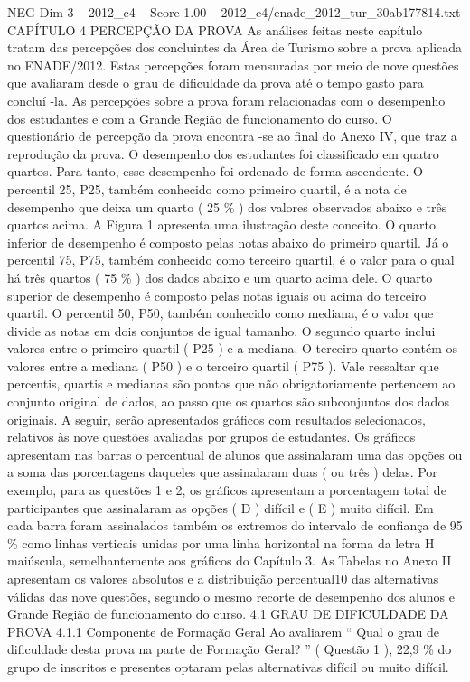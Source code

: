 \begin{textsample}{NEG Dim 3 – 2012\_c4 – Score 1.00 – 2012\_c4/enade\_2012\_tur\_30ab177814.txt}  \label{ex:f3_neg_132}
CAPÍTULO 4 PERCEPÇÃO DA PROVA As análises feitas neste capítulo tratam das percepções dos concluintes da Área de Turismo sobre a prova aplicada no ENADE/2012.
Estas percepções foram mensuradas por meio de nove questões que avaliaram desde o grau de dificuldade da prova até o tempo gasto para concluí -la.
As percepções sobre a prova foram relacionadas com o desempenho dos estudantes e com a Grande Região de funcionamento do curso.
O questionário de percepção da prova encontra -se ao final do Anexo IV, que traz a reprodução da prova.
O desempenho dos estudantes foi classificado em quatro quartos.
Para tanto, esse desempenho foi ordenado de forma ascendente.
O percentil 25, P25, também conhecido como primeiro quartil, é a nota de desempenho que deixa um quarto ( 25 \% ) dos valores observados abaixo e três quartos acima.
A Figura 1 apresenta uma ilustração deste conceito.
O quarto inferior de desempenho é composto pelas notas abaixo do primeiro quartil.
Já o percentil 75, P75, também conhecido como terceiro quartil, é o valor para o qual há três quartos ( 75 \% ) dos dados abaixo e um quarto acima dele.
O quarto superior de desempenho é composto pelas notas iguais ou acima do terceiro quartil.
O percentil 50, P50, também conhecido como mediana, é o valor que divide as notas em dois conjuntos de igual tamanho.
O segundo quarto inclui valores entre o primeiro quartil ( P25 ) e a mediana.
O terceiro quarto contém os valores entre a mediana ( P50 ) e o terceiro quartil ( P75 ).
Vale ressaltar que percentis, quartis e medianas são pontos que não obrigatoriamente pertencem ao conjunto original de dados, ao passo que os quartos são subconjuntos dos dados originais.
A seguir, serão apresentados gráficos com resultados selecionados, relativos às nove questões avaliadas por grupos de estudantes.
Os gráficos apresentam nas barras o percentual de alunos que assinalaram uma das opções ou a soma das porcentagens daqueles que assinalaram duas ( ou três ) delas.
Por exemplo, para as questões 1 e 2, os gráficos apresentam a porcentagem total de participantes que assinalaram as opções ( D ) difícil e ( E ) muito difícil.
Em cada barra foram assinalados também os extremos do intervalo de confiança de 95 \% como linhas verticais unidas por uma linha horizontal na forma da letra H maiúscula, semelhantemente aos gráficos do Capítulo 3.
As Tabelas no Anexo II apresentam os valores absolutos e a distribuição percentual10 das alternativas válidas das nove questões, segundo o mesmo recorte de desempenho dos alunos e Grande Região de funcionamento do curso. 4.1 GRAU DE DIFICULDADE DA PROVA 4.1.1 Componente de Formação Geral Ao avaliarem “ Qual o grau de dificuldade desta prova na parte de Formação Geral? ” ( Questão 1 ), 22,9 \% do grupo de inscritos e presentes optaram pelas alternativas difícil ou muito difícil.

\end{textsample}
